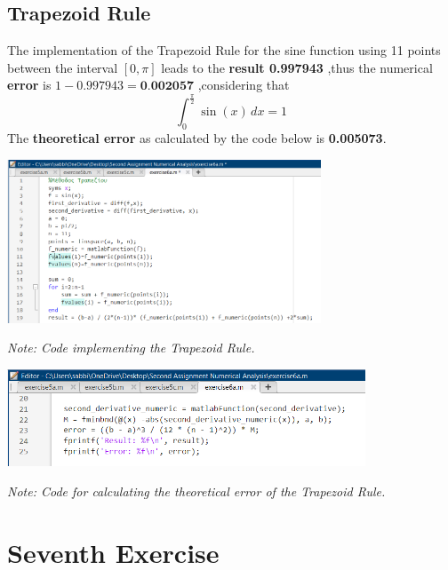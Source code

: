 \documentclass{article}
\begin{document}
\subsection{Trapezoid Rule}

The implementation of the Trapezoid Rule for the sine function using 11 points between the interval $[0,\pi]$ leads to the \textbf{result 0.997943} ,thus the numerical \textbf{error }is  $1-0.997943 = \textbf{0.002057}$ ,considering that \[
\int_{0}^{\frac{\pi}{2}} \sin(x) \, dx = 1
\] 
The \textbf{theoretical error} as calculated by the code below is \textbf{0.005073}.



\begin{tcolorbox}[colback=red!10, colframe=gray!80, width=\textwidth, sharp corners]
    \centering 
    \includegraphics[width=0.7\textwidth,height=0.2\textheight]{Exercise6bCode.png} 

    \vspace{0.1cm}
    \small\textit{Note: Code implementing the Trapezoid Rule. }
\end{tcolorbox}

\begin{tcolorbox}[colback=red!10, colframe=gray!80, width=\textwidth, sharp corners]
    \centering 
    \includegraphics[width=0.8\textwidth,height=0.12\textheight]{Exercise6bError.png} 

    \vspace{0.1cm}
    \small\textit{Note: Code for calculating the theoretical error of the Trapezoid Rule. }
\end{tcolorbox}
\newpage
\vspace{5cm}
\section{Seventh Exercise}
\end{document}
